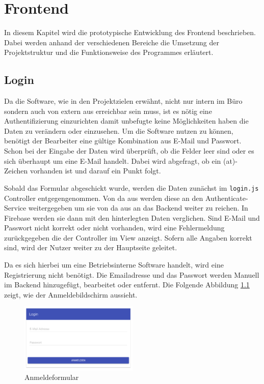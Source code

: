 \chapter{Frontend}
In diesem Kapitel wird die prototypische Entwicklung des Frontend beschrieben. Dabei werden anhand der verschiedenen Bereiche die Umsetzung der
Projektstruktur und die Funktionsweise des Programmes erläutert.

\section{Login}
Da die Software, wie in den Projektzielen erwähnt, nicht nur intern im Büro sondern auch von extern aus erreichbar sein muss, ist es nötig eine Authentifizierung
einzurichten damit unbefugte keine Möglichkeiten haben die Daten zu verändern oder einzusehen. Um die Software nutzen zu können, benötigt der Bearbeiter eine gültige
Kombination aus E-Mail und Passwort. Schon bei der Eingabe der Daten wird überprüft, ob die Felder leer sind oder es sich überhaupt um eine E-Mail handelt. Dabei wird
abgefragt, ob ein (at)-Zeichen vorhanden ist und darauf ein Punkt folgt.

Sobald das Formular abgeschickt wurde, werden die Daten zunächst im \texttt{login.js} Controller entgegengenommen. Von da aus werden diese an den Authenticate-Service
weitergegeben um sie von da aus an das Backend weiter zu reichen. In Firebase werden sie dann mit den hinterlegten Daten verglichen. Sind E-Mail und Passwort nicht
korrekt oder nicht vorhanden, wird eine Fehlermeldung zurückgegeben die der Controller im View anzeigt. Sofern alle Angaben korrekt sind, wird der Nutzer weiter zu
der Hauptseite geleitet.

Da es sich hierbei um eine Betriebsinterne Software handelt, wird eine Registrierung nicht benötigt.
Die Emailadresse und das Passwort werden Manuell im Backend hinzugefügt, bearbeitet oder entfernt.
Die Folgende Abbildung \ref{frontend_login} zeigt, wie der Anmeldebildschirm aussieht. 

\begin{figure}[H]
\centering\includegraphics[width=0.5\textwidth]{images/frontend_login.png}
\caption{Anmeldeformular}
\label{frontend_login}
\end{figure}

